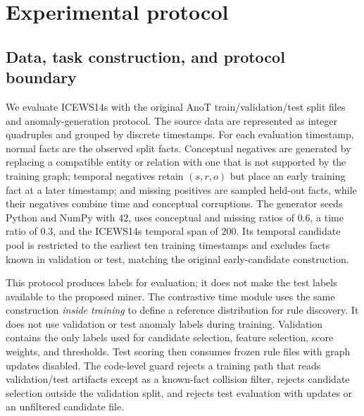 \section{Experimental protocol}

\subsection{Data, task construction, and protocol boundary}

We evaluate ICEWS14s with the original AnoT train/validation/test split files and anomaly-generation protocol. The source data are represented as integer quadruples and grouped by discrete timestamps. For each evaluation timestamp, normal facts are the observed split facts. Conceptual negatives are generated by replacing a compatible entity or relation with one that is not supported by the training graph; temporal negatives retain $(s,r,o)$ but place an early training fact at a later timestamp; and missing positives are sampled held-out facts, while their negatives combine time and conceptual corruptions. The generator seeds Python and NumPy with $42$, uses conceptual and missing ratios of $0.6$, a time ratio of $0.3$, and the ICEWS14s temporal span of $200$. Its temporal candidate pool is restricted to the earliest ten training timestamps and excludes facts known in validation or test, matching the original early-candidate construction.

This protocol produces labels for evaluation; it does not make the test labels available to the proposed miner. The contrastive time module uses the same construction \emph{inside training} to define a reference distribution for rule discovery. It does not use validation or test anomaly labels during training. Validation contains the only labels used for candidate selection, feature selection, score weights, and thresholds. Test scoring then consumes frozen rule files with graph updates disabled. The code-level guard rejects a training path that reads validation/test artifacts except as a known-fact collision filter, rejects candidate selection outside the validation split, and rejects test evaluation with updates or an unfiltered candidate file.

